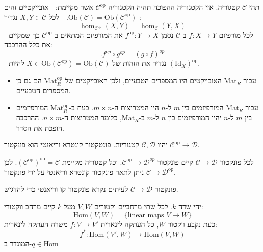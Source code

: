 \documentclass{tstextbook}
\begin{document}
\begin{definition}
תהי \(\mathcal{C}\) קטגוריה. אזי הקטגוריה ההפוכה תהיה הקטגוריה \(\mathcal{C}^{\text{op}}\) אשר מקיימת:
- אובייקטיים זהים -\(\text{Ob}(\mathcal{C})=\text{Ob}(\mathcal{C}^{\text{op}})\).
- לכל \(X,Y\in \mathcal{C}\) נגדיר:
$$\hom_{{\mathcal{C}}^{o p}}\left(X,Y\right)=\hom_{{\mathcal{C}}}\left(Y,X\right)$$
- לכל מורפיזם \(f:X\to Y\) ב-\(\mathcal{C}\) נסמן \(f^{\text{op}}:Y\to X\) את המורפיזם המתאים ב-\(\mathcal{C}^{\text{op}}\) כך שמקיים את כלל ההרכבה:
$$.f^{o p}\circ g^{o p}=(g\circ f)^{o p}$$
- נגדיר את הזהות של \(X \in \mathrm{Ob}(\mathcal{C}^{\text{op}})=\mathrm{Ob}(\mathcal{C})\) להיות \((\mathrm{Id}_{X})^{\text{op}}\).

\end{definition}
\begin{example}
  \begin{itemize}
    \item עבור \(\text{Mat}_{R}\) האובייקטים היו המספרים הטבעיים, ולכן האובייקטים של \(\text{Mat}_{R}^{\text{op}}\) הם גם כן המספרים הטבעיים.
    \item עבור \(\text{Mat}_{R}\) המורפיזמים בין \(m\) ל-\(n\) היו המטריצות ה-\(m\times n\). כעת ב-\(\text{Mat}_{R}^{\text{op}}\) המורפיזמים בין \(m\) ל-\(n\) יהיו המורפיזמים בין \(n\) ל-\(m\) ב-\(\mathrm{Mat}_{R}\), כלומר המטריצות ה-\(n \times m\). ההרכבה הופכת את הסדר.
  \end{itemize}
\end{example}
\begin{definition}
יהיו \(\mathcal{C},\mathcal{D}\) קטגוריות. פונטקטור קונטרא וריאנטי הוא פונקטור \(\mathcal{C}^{\text{op}}\to \mathcal{D}\).

\end{definition}
\begin{remark}
לכל פונקטור \(\mathcal{C}\to \mathcal{D}\) קיים פונקטור \(\mathcal{C}^{\text{op}}\to \mathcal{D}^{op}\). וכל קטגוריה מקיימת \((\mathcal{C}^{\text{op}})^{\text{op}}=\mathcal{C}\). לכן ניתן לתאר פונקטור קונטרא וריאנטי על ידי פונקטור \(\mathcal{C}\to \mathcal{D}^{\text{op}}\).

\end{remark}
\begin{remark}
פונקטור \(\mathcal{C}\to \mathcal{D}\) לעיתים נקרא פונקטור קו וריאנטי כדי להדגיש.

\end{remark}
\begin{example}
יהי שדה \(k\). לכל שתי מרחביים וקטורים \(V,W\) מעל \(k\) קיים מרחב ווקטורי:
$$\mathrm{Hom}(V,W)=\{ \text{linear maps }V \to W\}$$
כעת נקבע ווקטור \(W\), כל העתקה לינארית \(f:V\to V'\) משרה העתקה לינארית:
$$f^{*}:\mathrm{Hom}(V',W)\to \mathrm{Hom}(V,W)$$
המוגדר ב-\(q \in \mathrm{Hom}\)

\end{example}
\end{document}
